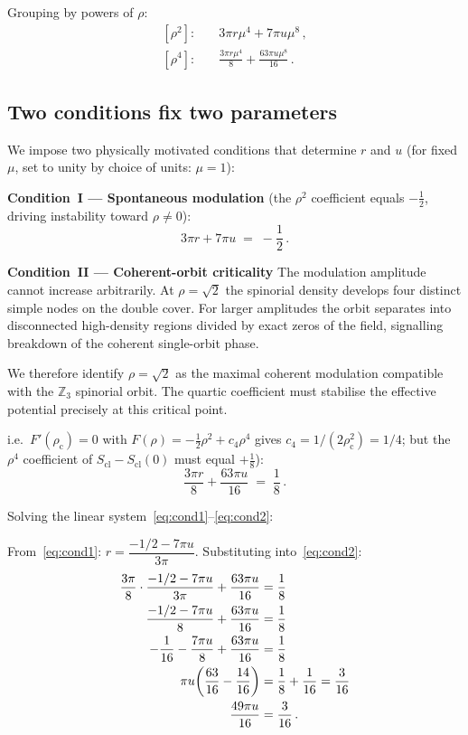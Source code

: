 \documentclass[12pt,a4paper]{article}
\theoremstyle{definition}
\newcommand{\rhoc}{\rho_{\mathrm{c}}}
\newcommand{\Scl}{S_{\mathrm{cl}}}
\begin{document}
Grouping by powers of $\rho$:
\begin{align}
  \label{eq:rho2_coeff}
  [\rho^2]\colon&\quad 3\pi r\mu^4 + 7\pi u\mu^8\,,\\
  \label{eq:rho4_coeff}
  [\rho^4]\colon&\quad \frac{3\pi r\mu^4}{8} + \frac{63\pi u\mu^8}{16}\,.
\end{align}

\subsection{Two conditions fix two parameters}

We impose two physically motivated conditions that determine $r$ and $u$
(for fixed $\mu$, set to unity by choice of units: $\mu = 1$):

\medskip
\noindent\textbf{Condition~I — Spontaneous modulation} (the $\rho^2$ coefficient
equals $-\tfrac{1}{2}$, driving instability toward $\rho \neq 0$):
\begin{equation}
  \label{eq:cond1}
  3\pi r + 7\pi u \;=\; -\frac{1}{2}\,.
\end{equation}

\noindent\textbf{Condition~II — Coherent-orbit criticality}
The modulation amplitude cannot increase arbitrarily.
At $\rho=\sqrt2$ the spinorial density develops four distinct
simple nodes on the double cover.
For larger amplitudes the orbit separates into disconnected
high-density regions divided by exact zeros of the field,
signalling breakdown of the coherent single-orbit phase.

We therefore identify $\rho=\sqrt2$ as the maximal coherent
modulation compatible with the $\mathbb{Z}_3$ spinorial orbit.
The quartic coefficient must stabilise the effective potential
precisely at this critical point.

i.e.\
$F'(\rhoc) = 0$ with $F(\rho) = -\tfrac{1}{2}\rho^2 + c_4\rho^4$
gives $c_4 = 1/(2\rhoc^2) = 1/4$; but the $\rho^4$ coefficient
of $\Scl - \Scl(0)$ must equal $+\tfrac{1}{8}$):
\begin{equation}
  \label{eq:cond2}
  \frac{3\pi r}{8} + \frac{63\pi u}{16} \;=\; \frac{1}{8}\,.
\end{equation}

\noindent Solving the linear system~\eqref{eq:cond1}--\eqref{eq:cond2}:

\medskip
From~\eqref{eq:cond1}: $r = \dfrac{-1/2 - 7\pi u}{3\pi}$.
Substituting into~\eqref{eq:cond2}:
\begin{align}
  \frac{3\pi}{8}\cdot\frac{-1/2-7\pi u}{3\pi} + \frac{63\pi u}{16}
  &= \frac{1}{8} \notag\\
  \frac{-1/2-7\pi u}{8} + \frac{63\pi u}{16}
  &= \frac{1}{8} \notag\\
  -\frac{1}{16} - \frac{7\pi u}{8} + \frac{63\pi u}{16}
  &= \frac{1}{8} \notag\\
  \pi u\!\left(\frac{63}{16} - \frac{14}{16}\right)
  &= \frac{1}{8} + \frac{1}{16}
   = \frac{3}{16} \notag\\
  \frac{49\pi u}{16} &= \frac{3}{16}\,.
\end{align}
\end{document}
